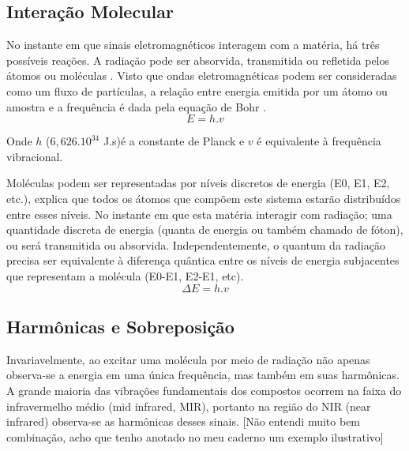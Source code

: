 \documentclass[oneside,openright,12pt]{ufsm_2021} %
\begin{document}
        \subsection{Interação Molecular} %
        \par No instante em que sinais eletromagnéticos interagem com a matéria, há três possíveis reações. A radiação pode ser absorvida, transmitida ou refletida pelos átomos ou moléculas \cite{debuc}. Visto que ondas eletromagnéticas podem ser consideradas como um fluxo de partículas, a relação entre energia emitida por um átomo ou amostra e a frequência é dada pela equação de Bohr \cite{livroSpecFund}. 
            \begin{equation}
            \label{eq:quantica}
             E=h.v 
            \end{equation}
        \par Onde $h$ ($6,626.10^{34}$ J.s)é a constante de Planck e $v$ é equivalente à frequência vibracional. 
        \par Moléculas podem ser representadas por níveis discretos de energia (E0, E1, E2, etc.), \cite{livroSpecFund} explica que todos os átomos que compõem este sistema estarão distribuídos entre esses níveis. No instante em que esta matéria interagir com radiação; uma quantidade discreta de energia (quanta de energia ou também chamado de fóton), ou será transmitida ou absorvida. Independentemente, o quantum da radiação precisa ser equivalente à diferença quântica entre os níveis de energia subjacentes que representam a molécula (E0-E1, E2-E1, etc).
            \begin{equation}
            \label{eq:quantica2}
             \Delta E = h.v
            \end{equation}
            
        \subsection{Harmônicas e Sobreposição}
        \par Invariavelmente, ao excitar uma molécula por meio de radiação não apenas observa-se a energia em uma única frequência, mas também em suas harmônicas. A grande maioria das vibrações fundamentais dos
        compostos ocorrem na faixa do infravermelho médio (mid infrared, MIR), portanto na região do NIR (near infrared) observa-se as harmônicas desses sinais. [Não entendi muito bem combinação, acho que tenho anotado no meu caderno um exemplo ilustrativo]
\end{document}
